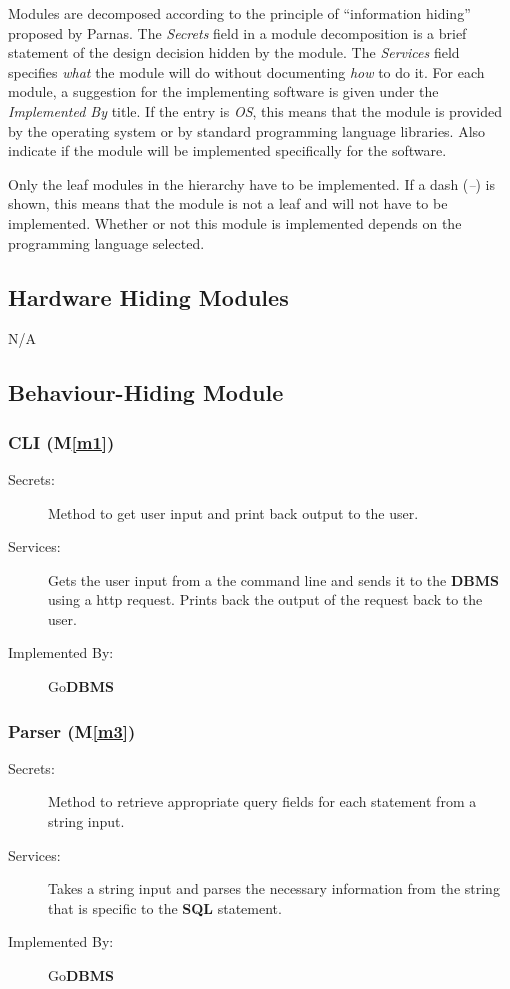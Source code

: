 \documentclass[12pt, titlepage]{article}
\newcommand{\mref}[1]{M\ref{#1}}
\begin{document}
Modules are decomposed according to the principle of ``information hiding''
proposed by Parnas. The \emph{Secrets} field in a module
decomposition is a brief statement of the design decision hidden by the
module. The \emph{Services} field specifies \emph{what} the module will do
without documenting \emph{how} to do it. For each module, a suggestion for the
implementing software is given under the \emph{Implemented By} title. If the
entry is \emph{OS}, this means that the module is provided by the operating
system or by standard programming language libraries.  Also indicate if the
module will be implemented specifically for the software.

Only the leaf modules in the
hierarchy have to be implemented. If a dash (\emph{--}) is shown, this means
that the module is not a leaf and will not have to be implemented. Whether or
not this module is implemented depends on the programming language
selected.

\subsection{Hardware Hiding Modules}
N/A

\subsection{Behaviour-Hiding Module}

\subsubsection{\textbf{CLI} (\mref{m1})}
\begin{description}
\item[Secrets:]Method to get user input and print back output to the user.
\item[Services:]Gets the user input from a the command line and sends it to the \textbf{DBMS} using a http request. Prints back the output of the request back to the user.
\item[Implemented By:] Go\textbf{DBMS}
\end{description}

\subsubsection{Parser (\mref{m3})}
\begin{description}
\item[Secrets:]Method to retrieve appropriate query fields for each statement from a string input.
\item[Services:]Takes a string input and parses the necessary information from the string that is specific to the \textbf{SQL} statement.
\item[Implemented By:] Go\textbf{DBMS}
\end{description}
\end{document}
